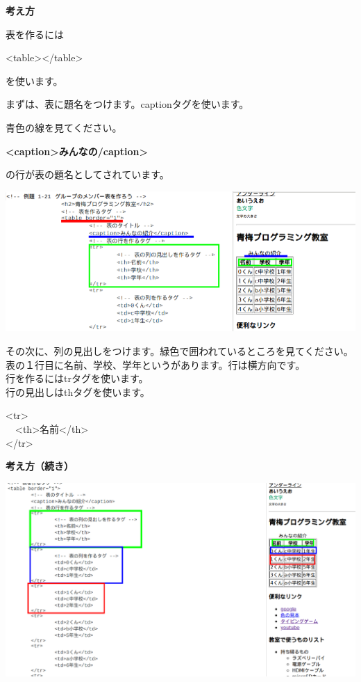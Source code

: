 \documentclass[a4paper,12pt]{jarticle}
\begin{document}
\bigskip

\flushleft
\textbf{考え方}



表を作るには

{\textless}table{\textgreater}{\textless}/table{\textgreater}

を使います。

まずは、表に題名をつけます。captionタグを使います。

青色の線を見てください。

\textbf{{\textless}caption{\textgreater}みんなの/caption{\textgreater}}

の行が表の題名としてされています。



\bigskip

\includegraphics[width=13.462cm]{textbook-img190.png}


\bigskip

その次に、列の見出しをつけます。緑色で囲われているところを見てください。\\
表の１行目に名前、学校、学年というがあります。行は横方向です。\\
行を作るにはtrタグを使います。\\
行の見出しはthタグを使います。\\


\bigskip

{\textless}tr{\textgreater}\\
\ \ {\textless}th{\textgreater}名前{\textless}/th{\textgreater}\\
{\textless}/tr{\textgreater}\\

\bigskip

\clearpage
\textbf{考え方（続き）}



\bigskip

\bigskip


\centering
\includegraphics[width=\textwidth]{textbook-img191.png}
\end{document}
